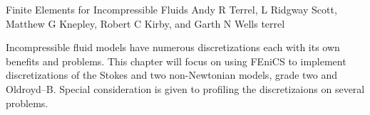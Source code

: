               {Finite Elements for Incompressible Fluids}
              {Andy R Terrel, L Ridgway Scott, Matthew G Knepley, Robert C Kirby, and Garth N Wells}
              {terrel}

Incompressible fluid models have numerous discretizations each with
its own benefits and problems. This chapter will focus on using FEniCS
to implement discretizations of the Stokes and two non-Newtonian
models, grade two and Oldroyd--B. Special consideration is given to
profiling the discretizaions on several problems.
